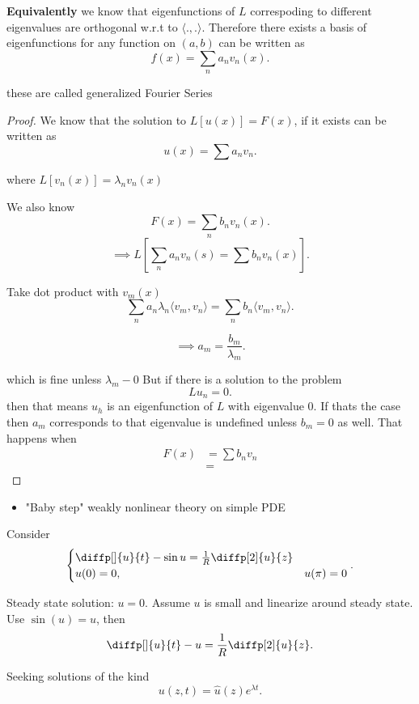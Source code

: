 \textbf{Equivalently} we know that eigenfunctions of $L$ correspoding to
different eigenvalues are orthogonal w.r.t to $ \langle., .  \rangle$.
Therefore there exists a basis of eigenfunctions for any function on $ (a,b)$
can be written as
\[
  f(x) = \sum_{n}a_{n}v_{n}(x)
.\] 

these are called generalized Fourier Series

\begin{proof}
  We know that the solution to $L [u (x)] = F(x)$, if it exists can be written
  as
  \[
  u (x) = \sum a_{n}v_{n}
  .\] 

  where $L [v_{n}(x)] = \lambda _{n}v_{n}(x)$ 

  We also know 
  \[
    F (x) = \sum_{n} b_{n}v_{n}(x)
  .\] 
  \[
    \implies L [ \sum_{n} a_{n}v_{n}(s) = \sum b_{n}v_{n}(x)]
  .\] 

  Take dot product with $v_{m} (x)$ 
  \[
  \sum_{n} a_{n} \lambda _{n} \langle v_{m}, v_{n} \rangle = \sum_{n} b_{n}
  \langle v_{m}, v_{n} \rangle
  .\] 

  \[
    \implies  a_{m} = \frac{b_{m}}{\lambda _{m}}
  .\] 

  which is fine unless $\lambda _{m} - 0$ But if there is a solution to the
  problem 
  \[
  Lu_{n} = 0
  .\] 
  then that means $u_{h}$ is an eigenfunction of $L$ with eigenvalue $0$. If
  thats the case then $a_{m}$ corresponds to that eigenvalue is undefined unless
  $b_{m} = 0$ as well. That happens when
  \begin{align*}
    F(x) &= \sum b_{n}v_{n} \\
         &=
  \end{align*}
\end{proof}

\begin{itemize}
  \item "Baby step" weakly nonlinear theory on simple PDE
\end{itemize}

Consider 
\[
\begin{cases}
  \diffp[]{u}{t} -\sin u = \frac{1}{R} \diffp[2]{u}{z} \\
  u(0) = 0, & u( \pi ) = 0
\end{cases}
.\] 

Steady state solution: $u= 0$. Assume $u$ is small and linearize around steady
state. Use $\sin(u) = u$, then
\[
\diffp[]{u}{t} -u = \frac{1}{R} \diffp[2]{u}{z}
.\] 

Seeking solutions of the kind
\[
  u(z,t) = \hat{u }(z)e^{\lambda t}
.\] 

